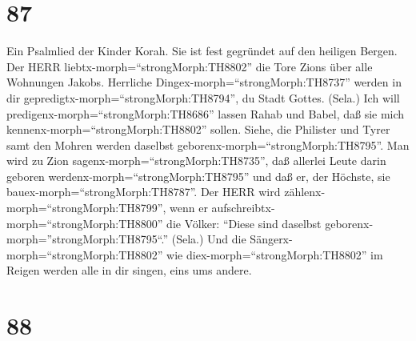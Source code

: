 \hypertarget{section-86}{%
\section{87}\label{section-86}}

 Ein Psalmlied der Kinder Korah. Sie ist fest gegründet auf
den heiligen Bergen.  Der HERR
liebtx-morph=``strongMorph:TH8802'' die Tore Zions über alle Wohnungen
Jakobs.  Herrliche Dingex-morph=``strongMorph:TH8737''
werden in dir gepredigtx-morph=``strongMorph:TH8794'', du Stadt Gottes.
(Sela.)  Ich will predigenx-morph=``strongMorph:TH8686''
lassen Rahab und Babel, daß sie mich
kennenx-morph=``strongMorph:TH8802'' sollen. Siehe, die Philister und
Tyrer samt den Mohren werden daselbst
geborenx-morph=``strongMorph:TH8795''.  Man wird zu Zion
sagenx-morph=``strongMorph:TH8735'', daß allerlei Leute darin geboren
werdenx-morph=``strongMorph:TH8795'' und daß er, der Höchste, sie
bauex-morph=``strongMorph:TH8787''.  Der HERR wird
zählenx-morph=``strongMorph:TH8799'', wenn er
aufschreibtx-morph=``strongMorph:TH8800'' die Völker: ``Diese sind
daselbst geborenx-morph=''strongMorph:TH8795``.'' (Sela.) 
Und die Sängerx-morph=``strongMorph:TH8802'' wie
diex-morph=``strongMorph:TH8802'' im Reigen werden alle in dir singen,
eins ums andere.

\hypertarget{section-87}{%
\section{88}\label{section-87}}

